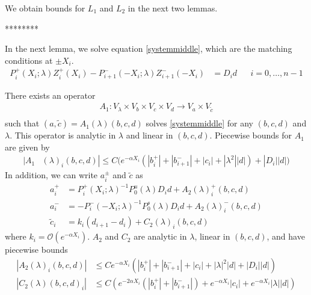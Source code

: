 \documentclass[thesis.tex]{subfiles}
\begin{document}
We obtain bounds for $L_1$ and $L_2$ in the next two lemmas.











********

In the next lemma, we solve equation \eqref{systemmiddle}, which are the matching conditions at $\pm X_i$.
\begin{align*}
P_i^+(X_i; \lambda) Z_i^+(X_i) - P_{i+1}^-(-X_i; \lambda) Z_{i+1}^-(-X_i) &= D_i d && i = 0, \dots, n-1
\end{align*}

\begin{lemma}\label{Zinv1}
There exists an operator
\begin{align*}
A_1: V_\lambda \times V_b \times V_c \times V_d \rightarrow V_a \times V_{\tilde{c}} \\
\end{align*}
such that $(a, \tilde{c}) = A_1(\lambda)(b, c, d)$ solves \eqref{systemmiddle} for any $(b, c, d)$ and $\lambda$. This operator is analytic in $\lambda$ and linear in $(b, c, d)$. Piecewise bounds for $A_1$ are given by
\begin{align}\label{A1bound}
|A_1&(\lambda)_i(b, c, d)|
\leq C \Big( e^{-\alpha X_i} (|b_i^+| + |b_{i+1}^-| + |c_i| + |\lambda^2||d|) + |D_i||d| \Big)
\end{align} 
In addition, we can write $a_i^\pm$ and $\tilde{c}$ as 
\begin{align*}
a_i^+ &= P_i^+(X_i; \lambda)^{-1} P_0^u(\lambda) D_i d + A_2(\lambda)_i^+(b, c, d) \\
a_i^- &= -P_i^-(-X_i; \lambda)^{-1} P_0^s(\lambda) D_i d + A_2(\lambda)_i^-(b, c, d) \\
\tilde{c}_i &= k_i (d_{i+1} - d_i) + C_2(\lambda)_i(b, c, d)
\end{align*}
where $k_i = \mathcal{O}(e^{-\alpha X_i})$. $A_2$ and $C_2$ are analytic in $\lambda$, linear in $(b, c, d)$, and have piecewise bounds
\begin{align}
|A_2(\lambda)_i(b, c, d)|
&\leq C e^{-\alpha X_i} \left( |b_i^+| + |b_{i+1}^-| + |c_i| + |\lambda|^2|d| + |D_i||d| \right) \label{A2bound} \\
|C_2(\lambda)(b, c, d)_i| &\leq 
C \left( e^{-2 \alpha X_i} (|b_i^+| + |b_{i+1}^-|) + e^{-\alpha X_i}|c_i| + e^{-\alpha X_i}|\lambda||d| \right) \label{C2bound}
\end{align}


\end{lemma}
\end{document}
